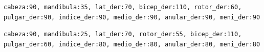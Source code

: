 \texttt{cabeza:90, mandibula:35, lat\_der:70, bicep\_der:110, rotor\_der:60, pulgar\_der:90, indice\_der:90, medio\_der:90, anular\_der:90, meni\_der:90}

\texttt{cabeza:90, mandibula:25, lat\_der:70, rotor\_der:55, bicep\_der:110, pulgar\_der:60, indice\_der:80, medio\_der:80, anular\_der:80, meni\_der:80}
